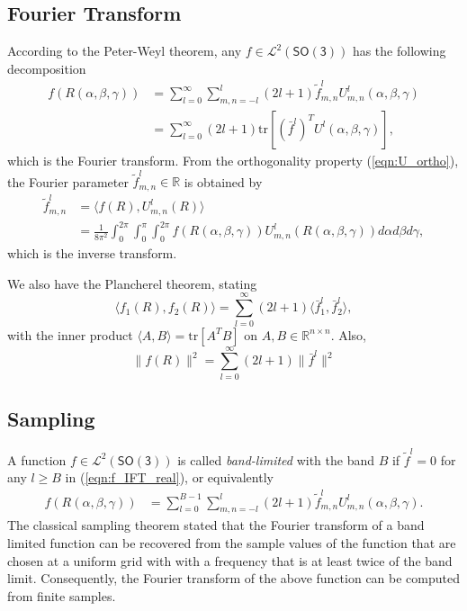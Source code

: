 \documentclass[onecolumn,11pt]{IEEEtran}
\newcommand{\pair}[1]{\ensuremath{\langle #1 \rangle}}
\newcommand{\refeqn}[1]{(\ref{eqn:#1})}
\newcommand{\trs}[1]{\mathrm{tr}\ensuremath{[#1]}}
\newcommand{\SO}{\ensuremath{\mathsf{SO(3)}}}
\renewcommand{\Re}{\ensuremath{\mathbb{R}}}
\begin{document}
\subsection{Fourier Transform}
According to the Peter-Weyl theorem, any $f\in\mathcal{L}^2(\SO)$ has the following decomposition
\begin{align}
f(R(\alpha,\beta,\gamma)) &= \sum_{l=0}^\infty \sum_{m,n=-l}^l (2l+1)\tilde f^l_{m,n} U^l_{m,n}(\alpha,\beta,\gamma)\nonumber\\
                          &= \sum_{l=0}^\infty (2l+1)\trs{(\bar f^l)^T U^l(\alpha,\beta,\gamma)},\label{eqn:f_IFT_real}
\end{align}
which is the Fourier transform. 
From the orthogonality property \refeqn{U_ortho}, the Fourier parameter $\tilde f^l_{m,n}\in\Re$ is obtained by
\begin{align}
    \tilde f^l_{m,n} &= \pair{ f(R), U^l_{m,n}(R)}\nonumber\\
                     & =\frac{1}{8\pi^2}\int_0^{2\pi}\int_{0}^\pi\int_0^{2\pi} f(R(\alpha,\beta,\gamma)) {U^{l}_{m,n}(R(\alpha,\beta,\gamma))}d\alpha d\beta d\gamma,\label{eqn:f_FT_real}
\end{align}
which is the inverse transform. 

We also have the Plancherel theorem, stating
\[
\pair{f_1(R), f_2(R)} = \sum_{l=0}^\infty (2l+1)\pair{\bar f_1^l, \bar f_2^l},
\]
with the inner product $\pair{A,B}=\trs{A^TB}$ on $A,B\in\Re^{n\times n}$. Also, 
\[
\| f(R)\|^2 = \sum_{l=0}^\infty (2l+1)\|\bar f^l\|^2
\]

\subsection{Sampling}

A function $f\in\mathcal{L}^2(\SO)$ is called \textit{band-limited} with the band $B$ if $\tilde f^l=0$ for any $l\geq B$ in \refeqn{f_IFT_real}, or equivalently
\begin{align}
f(R(\alpha,\beta,\gamma)) &= \sum_{l=0}^{B-1} \sum_{m,n=-l}^l (2l+1)\tilde f^l_{m,n} U^l_{m,n}(\alpha,\beta,\gamma).\label{eqn:fB_real}
\end{align}
The classical sampling theorem stated that the Fourier transform of a band limited function can be recovered from the sample values of the function that are chosen at a uniform grid with with a frequency that is at least twice of the band limit. 
Consequently, the Fourier transform of the above function can be computed from finite samples. 
\end{document}
